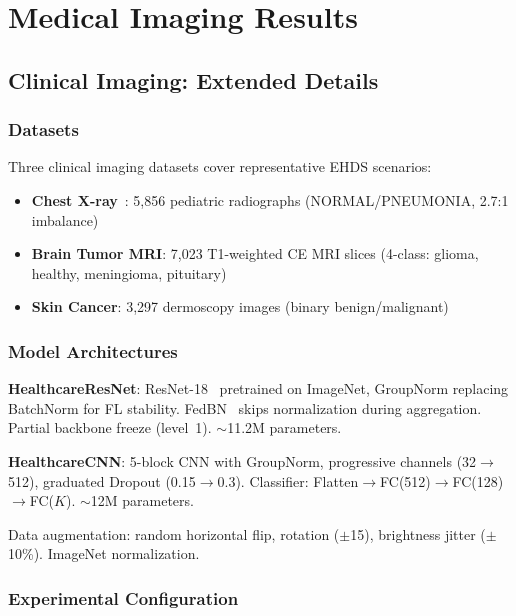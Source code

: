 \documentclass[conference]{IEEEtran}
\begin{document}
\section{Medical Imaging Results}
\label{app:imaging}

\subsection{Clinical Imaging: Extended Details}
\label{sec:imaging}

\subsubsection{Datasets}

Three clinical imaging datasets cover representative EHDS scenarios:
\begin{itemize}
    \item \textbf{Chest X-ray}~\cite{chestxray2018}: 5,856 pediatric radiographs (NORMAL/PNEUMONIA, 2.7:1 imbalance)
    \item \textbf{Brain Tumor MRI}: 7,023 T1-weighted CE MRI slices (4-class: glioma, healthy, meningioma, pituitary)
    \item \textbf{Skin Cancer}: 3,297 dermoscopy images (binary benign/malignant)
\end{itemize}

\subsubsection{Model Architectures}

\textbf{HealthcareResNet}: ResNet-18~\cite{he2016deep} pretrained on ImageNet, GroupNorm replacing BatchNorm for FL stability. FedBN~\cite{li2021fedbn} skips normalization during aggregation. Partial backbone freeze (level~1). $\sim$11.2M parameters.

\textbf{HealthcareCNN}: 5-block CNN with GroupNorm, progressive channels (32$\to$512), graduated Dropout (0.15$\to$0.3). Classifier: Flatten$\to$FC(512)$\to$FC(128)$\to$FC($K$). $\sim$12M parameters.

Data augmentation: random horizontal flip, rotation ($\pm$15\textdegree), brightness jitter ($\pm$10\%). ImageNet normalization.

\subsubsection{Experimental Configuration}
\end{document}
